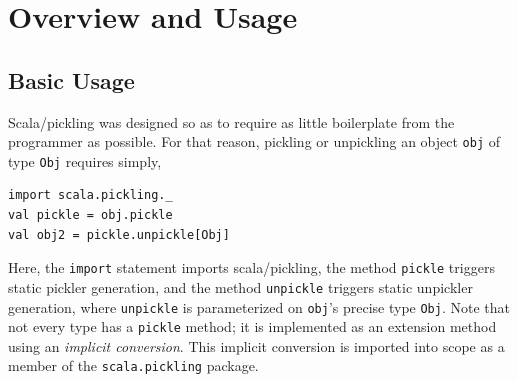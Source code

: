 \documentclass[preprint,10pt]{sigplanconf}
\theoremstyle{definition}
\theoremstyle{definition}
\newcommand{\term}[1]{\mbox{\texttt{#1}}}
\begin{document}





\section{Overview and Usage}
\label{sec:overview}

\subsection{Basic Usage}

Scala/pickling was designed so as to require as little
boilerplate from the programmer as possible. For that reason, pickling or
unpickling an object \term{obj} of type \term{Obj} requires simply,

\begin{lstlisting}
import scala.pickling._
val pickle = obj.pickle
val obj2 = pickle.unpickle[Obj]
\end{lstlisting}

Here, the \term{import} statement imports scala/pickling, the method
\term{pickle} triggers static pickler generation, and the method
\term{unpickle} triggers static unpickler generation, where \verb|unpickle| is
parameterized on \verb|obj|'s precise type \verb|Obj|. Note that not every
type has a \term{pickle} method; it is implemented as an extension method
using an {\em implicit conversion}. This implicit conversion is imported into
scope as a member of the \term{scala.pickling} package.
\end{document}
